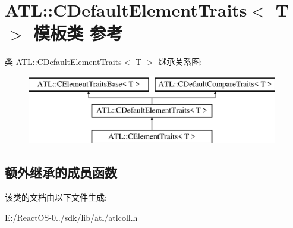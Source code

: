 \hypertarget{class_a_t_l_1_1_c_default_element_traits}{}\section{A\+TL\+:\+:C\+Default\+Element\+Traits$<$ T $>$ 模板类 参考}
\label{class_a_t_l_1_1_c_default_element_traits}
类 A\+TL\+:\+:C\+Default\+Element\+Traits$<$ T $>$ 继承关系图\+:\begin{figure}[H]
\begin{center}
\leavevmode
\includegraphics[height=3.000000cm]{class_a_t_l_1_1_c_default_element_traits}
\end{center}
\end{figure}
\subsection*{额外继承的成员函数}


该类的文档由以下文件生成\+:\begin{DoxyCompactItemize}
\item 
E\+:/\+React\+O\+S-\/0../sdk/lib/atl/atlcoll.\+h\end{DoxyCompactItemize}
